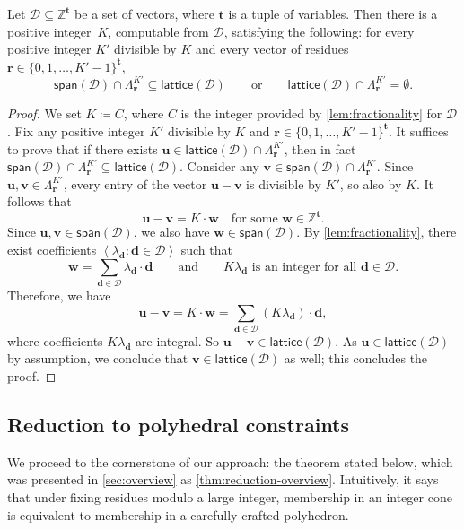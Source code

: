\documentclass{article}
\newcommand{\Dd}{\mathcal{D}}
\newcommand{\Z}{\mathbb{Z}}
\newcommand{\tup}[1]{{\mathbf{#1}}}
\newcommand{\ww}{\tup w}
\newcommand{\tv}{\tup t}
\newcommand{\rr}{\tup r}
\newcommand{\dd}{\tup d}
\newcommand{\uu}{\tup u}
\newcommand{\myvv}{\tup v} %
\newcommand{\mset}[1]{\left\langle #1\right\rangle}
\newcommand{\lattice}{\mathsf{lattice}}
\newcommand{\spn}{\mathsf{span}}
\begin{document}
\begin{lemma}\label{lem:spaceCramer}
 Let $\Dd\subseteq \Z^\tv$ be a set of vectors, where $\tv$ is a tuple of variables. Then there is a positive integer~$K$, computable from $\Dd$, satisfying the following: for every positive integer $K'$ divisible by $K$ and every vector of residues $\rr\in \{0,1,\ldots,K'-1\}^\tv$,
 $$\spn(\Dd)\cap \Lambda^{K'}_\rr \subseteq \lattice(\Dd)\qquad\textrm{or}\qquad \lattice(\Dd)\cap \Lambda^{K'}_\rr=\emptyset.$$
\end{lemma}
\begin{proof}
 We set $K\coloneqq C$, where $C$ is the integer provided by \cref{lem:fractionality} for $\Dd$. Fix any positive integer $K'$ divisible by $K$ and $\rr\in \{0,1,\ldots,K'-1\}^\tv$.
 It suffices to prove that if there exists $\uu\in \lattice(\Dd)\cap \Lambda^{K'}_\rr$, then in fact $\spn(\Dd)\cap \Lambda^{K'}_\rr \subseteq \lattice(\Dd)$. Consider any $\myvv\in \spn(\Dd)\cap \Lambda^{K'}_\rr$. Since $\uu,\myvv\in \Lambda^{K'}_\rr$, every entry of the vector $\uu-\myvv$ is divisible by $K'$, so also by $K$. It follows that
 $$\uu-\myvv = K\cdot \ww\quad \textrm{for some }\ww\in \Z^{\tv}.$$
 Since $\uu,\myvv\in \spn(\Dd)$, we also have $\ww\in \spn(\Dd)$. By \cref{lem:fractionality}, there exist coefficients $\mset{\lambda_\dd\colon \dd\in \Dd}$ such that
 $$\ww=\sum_{\dd\in \Dd} \lambda_\dd\cdot \dd\qquad \textrm{and}\qquad K\lambda_\dd\textrm{ is an integer for all }\dd\in \Dd.$$
 Therefore, we have
 $$\uu-\myvv = K\cdot \ww = \sum_{\dd\in \Dd} (K\lambda_\dd)\cdot \dd,$$
 where coefficients $K\lambda_\dd$ are integral. So $\uu-\myvv\in \lattice(\Dd)$. As $\uu\in \lattice(\Dd)$ by assumption, we conclude that $\myvv\in \lattice(\Dd)$ as well; this concludes the proof.
\end{proof}

\subsection{Reduction to polyhedral constraints}

We proceed to the cornerstone of our approach: the theorem stated below, which was presented in \cref{sec:overview} as \cref{thm:reduction-overview}. Intuitively, it says that under fixing residues modulo a large integer, membership in an integer cone is equivalent to membership in a carefully crafted polyhedron.
\end{document}
